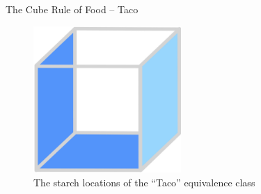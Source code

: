 \documentclass{beamer}
\begin{document}
\begin{frame}{The Cube Rule of Food -- Taco}
    \begin{figure}
        \includegraphics[width=0.5\textwidth]{taco/20_taco.jpg}
        \caption{\label{fig:taco-diagram}The starch locations of the ``Taco'' equivalence class}
    \end{figure}
\end{frame}
\end{document}
